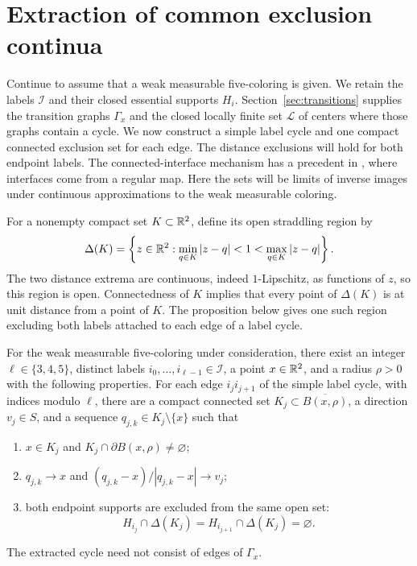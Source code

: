 \section{Extraction of common exclusion continua}
\label{sec:interfaces}

Continue to assume that a weak measurable five-coloring is given.
We retain the labels $\mathcal I$ and their closed essential supports
$H_i$.  Section~\ref{sec:transitions} supplies the transition graphs
$\Gamma_x$ and the closed locally finite set $\mathcal L$ of centers
where those graphs contain a cycle.  We now construct a simple label
cycle and one compact connected exclusion set for each edge.  The
distance exclusions will hold for both endpoint labels.  The
connected-interface mechanism has a precedent in
\citet[Propositions~1--2]{SokolovVoronov2025}, where interfaces come from
a regular map.  Here the sets will be limits of inverse images under
continuous approximations to the weak measurable coloring.

For a nonempty compact set $K\subset\mathbb R^2$, define its open
straddling region by
\begin{equation}
 \Delta(K)=
 \left\{z\in\mathbb R^2:
   \min_{q\in K}|z-q|<1<\max_{q\in K}|z-q|
 \right\}.
 \label{eq:source-24}
\end{equation}
The two distance extrema are continuous, indeed $1$-Lipschitz, as
functions of $z$, so this region is open. Connectedness of $K$ implies
that every point of $\Delta(K)$ is at unit distance from a point of $K$.
The proposition below gives one such region excluding both labels
attached to each edge of a label cycle.

\begin{proposition}
\label{prop:interface-cycle}
For the weak measurable five-coloring under consideration, there
exist an integer $\ell\in\{3,4,5\}$, distinct labels
$i_0,\ldots,i_{\ell-1}\in\mathcal I$, a point $x\in\mathbb R^2$, and a
radius $\rho>0$ with the following properties.  For each edge
$i_ji_{j+1}$ of the simple label cycle, with indices modulo $\ell$,
there are a compact connected set
$K_j\subset\overline{B(x,\rho)}$, a direction $v_j\in S$, and a
sequence $q_{j,k}\in K_j\setminus\{x\}$ such that
\begin{enumerate}
\item $x\in K_j$ and $K_j\cap\partial B(x,\rho)\ne\varnothing$;
\item $q_{j,k}\to x$ and
$(q_{j,k}-x)/|q_{j,k}-x|\to v_j$;
\item both endpoint supports are excluded from the same open set:
\[
 H_{i_j}\cap\Delta(K_j)=
 H_{i_{j+1}}\cap\Delta(K_j)=\varnothing.
\]
\end{enumerate}
The extracted cycle need not consist of edges of $\Gamma_x$.
\end{proposition}

